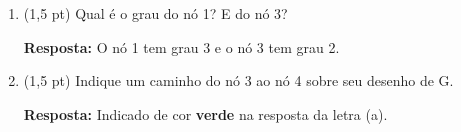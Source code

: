 \documentclass[12pt,a4paper,oneside]{article}
\begin{document}
\begin{enumerate}
\begin{enumerate}
{	}
	
	\item (1,5 pt) Qual é o grau do nó 1? E do nó 3?  
	
	\vspace*{0.3cm}
	
	{ \color{blue} {\bf Resposta:} O nó 1 tem grau 3 e o nó 3 tem grau 2.}
	\item (1,5 pt) Indique um caminho do nó 3 ao nó 4 sobre seu desenho de G.
	
	\vspace*{0.3cm}
	
	{ \color{blue} {\bf Resposta:} Indicado de cor {\color{green} \bf verde} na resposta da letra (a).}
\end{enumerate}

\end{enumerate}
\end{document}

